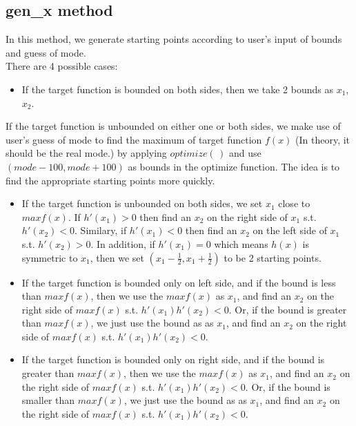\documentclass[11pt, oneside]{article}   	%
\begin{document}
\subsection*{ gen\_x method }
In this method, we generate starting points according to user's input of bounds and guess of mode. \\
There are 4 possible cases:
  \begin{itemize}
  \item  If the target function is bounded on both sides, then we take 2 bounds as $x_{1}$, $x_{2}$.
 \end{itemize}
If the target function is unbounded on either one or both sides, we make use of user's guess of mode to find the maximum of target function $f(x)$ (In theory, it should be the real mode.) by applying $optimize(\,)$ and use $(mode-100, mode+100)$ as bounds in the optimize function. The idea is to find the appropriate starting points more quickly.


 \begin{itemize}

  \item  If the target function is unbounded on both sides,  we set $x_{1}$ close to $maxf(x)$. If $h'(x_{1})>0$ then find an $x_{2}$ on the right side of $x_{1}$ s.t. $h'(x_{2})<0$. Similary, if $h'(x_{1})<0$ then find an $x_{2}$ on the left side of $x_{1}$ s.t. $h'(x_{2})>0$. In addition, if $h'(x_{1})=0$ which means $h(x)$ is symmetric to $x_{1}$, then we set $(x_{1}-\frac{1}{2},x_{1}+\frac{1}{2})$ to be 2 starting points.


  \item  If the target function is bounded only on left side,  and if the bound is less than $maxf(x)$, then we use the $maxf(x)$ as $x_{1}$, and find an $x_{2}$ on the right side of $maxf(x)$ s.t. $h'(x_{1})h'(x_{2})<0$. Or, if the bound is greater than $maxf(x)$, we just use the bound as as $x_{1}$, and find an $x_{2}$ on the right side of $maxf(x)$ s.t. $h'(x_{1})h'(x_{2})<0$.

  \item  If the target function is bounded only on right side,  and if the bound is greater than $maxf(x)$, then we use the $maxf(x)$ as $x_{1}$, and find an $x_{2}$ on the right side of $maxf(x)$ s.t. $h'(x_{1})h'(x_{2})<0$. Or, if the bound is smaller than $maxf(x)$, we just use the bound as as $x_{1}$, and find an $x_{2}$ on the right side of $maxf(x)$ s.t. $h'(x_{1})h'(x_{2})<0$.

 \end{itemize}
\end{document}
